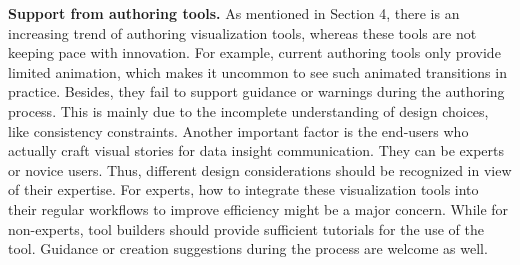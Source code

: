 \textbf{Support from authoring tools.} As mentioned in Section 4, there is an increasing trend of authoring visualization tools, whereas these tools are not keeping pace with innovation. For example, current authoring tools only provide limited animation, which makes it uncommon to see such animated transitions in practice. Besides, they fail to support guidance or warnings during the authoring process. This is mainly due to the incomplete understanding of design choices, like consistency constraints. Another important factor is the end-users who actually craft visual stories for data insight communication. They can be experts or novice users. Thus, different design considerations should be recognized in view of their expertise. For experts, how to integrate these visualization tools into their regular workflows to improve efficiency might be a major concern. While for non-experts, tool builders should provide sufficient tutorials for the use of the tool. Guidance or creation suggestions during the process are welcome as well. 

